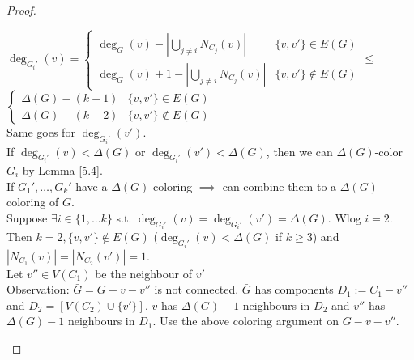 \begin{proof}
\begin{enumerate}
        $\deg_{G_i'}(v)=\begin{cases}
            \deg_G(v)-|\bigcup_{j\neq i} N_{C_j}(v)| & \{v,v'\}\in E(G) \\
            \deg_G(v)+1-|\bigcup_{j\neq i} N_{C_j}(v)| & \{v,v'\}\notin E(G)     
            \end{cases}\leq$ \\
            $\begin{cases}
            \Delta(G)-(k-1) & \{v,v'\}\in E(G) \\
            \Delta(G)-(k-2) & \{v,v'\}\notin E(G)
        \end{cases}$   \\
        Same goes for $\deg_{G_i'}(v')$.\\
        If $\deg_{G_i'}(v)<\Delta(G)$ or $\deg_{G_i'}(v')<\Delta(G)$, then we can $\Delta(G)$-color $G_i$ by Lemma \ref{5.4}.\\
        If $G_1',\dots,G_k'$ have a $\Delta(G)$-coloring $\implies$ can combine them to a $\Delta(G)$-coloring of $G$.\\
        Suppose $\exists i\in\{1,...k\}$ s.t. $\deg_{G_i'}(v)=\deg_{G_i'}(v')=\Delta(G)$. Wlog $i=2$. Then $k=2, \{v,v'\}\notin E(G)$ ($\deg_{G_i'}(v)<\Delta(G)$ if $k\geq 3$) and $|N_{C_1}(v)|=|N_{C_2}(v')|=1$.\\
        Let $v''\in V(C_1)$ be the neighbour of $v'$\\
        Observation: $\bar G=G-v-v''$ is not connected. $\bar G$ has components $D_1:=C_1-v''$ and $D_2=[V(C_2)\cup \{v'\}]$. $v$ has $\Delta(G)-1$ neighbours in $D_2$ and $v''$ has $\Delta(G)-1$ neighbours in $D_1$. Use the above coloring argument on $G-v-v''$. 
        \begin{center}
\end{center}
\end{enumerate}
\end{proof}
